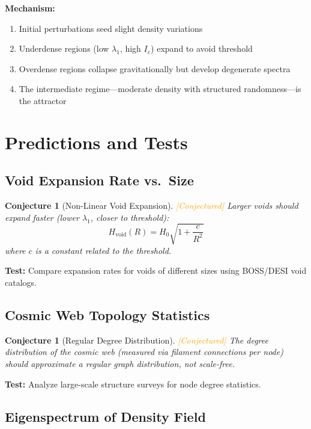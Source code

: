 \documentclass[11pt,a4paper]{article}
\theoremstyle{plain}
\newtheorem{conjecture}[theorem]{Conjecture}
\theoremstyle{definition}
\theoremstyle{remark}
\newcommand{\conjectured}{\textcolor{orange}{[Conjectured]}}
\begin{document}
\textbf{Mechanism:}
\begin{enumerate}[noitemsep]
    \item Initial perturbations seed slight density variations
    \item Underdense regions (low $\lambda_1$, high $I_e$) expand to avoid threshold
    \item Overdense regions collapse gravitationally but develop degenerate spectra
    \item The intermediate regime---moderate density with structured randomness---is the attractor
\end{enumerate}

\section{Predictions and Tests}

\subsection{Void Expansion Rate vs.\ Size}

\begin{conjecture}[Non-Linear Void Expansion] \conjectured
Larger voids should expand faster (lower $\lambda_1$, closer to threshold):
\[
H_{\text{void}}(R) = H_0 \sqrt{1 + \frac{c}{R^2}}
\]
where $c$ is a constant related to the threshold.
\end{conjecture}

\textbf{Test:} Compare expansion rates for voids of different sizes using BOSS/DESI void catalogs.

\subsection{Cosmic Web Topology Statistics}

\begin{conjecture}[Regular Degree Distribution] \conjectured
The degree distribution of the cosmic web (measured via filament connections per node) should approximate a regular graph distribution, not scale-free.
\end{conjecture}

\textbf{Test:} Analyze large-scale structure surveys for node degree statistics.

\subsection{Eigenspectrum of Density Field}
\end{document}
